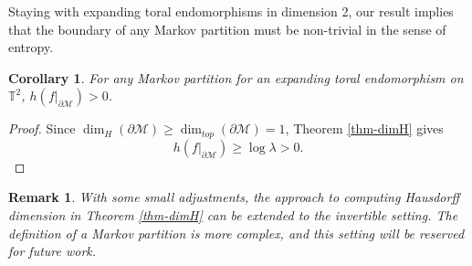 \documentclass{article}
\def\T{\mathbb{T}}
\def\M{\mathcal{M}}
\newtheorem{corollary}[theorem]{Corollary}
\newtheorem{remark}[theorem]{Remark}
\begin{document}
Staying with expanding toral endomorphisms in dimension 2, our result implies that the boundary of any Markov partition must be non-trivial in the sense of entropy.

\begin{corollary}
    For any Markov partition for an expanding toral endomorphism on $\T^2$, $h(f|_{\partial\M})>0$.
\end{corollary}

\begin{proof}
    Since $\dim_H(\partial\M)\geq \dim_{top}(\partial\M) = 1$, Theorem \ref{thm-dimH} gives $$h(f|_{\partial\M})\geq \log\lambda > 0.$$
\end{proof}


\begin{remark}
    With some small adjustments, the approach to computing Hausdorff dimension in Theorem \ref{thm-dimH} can be extended to the invertible setting. The definition of a Markov partition is more complex, and this setting will be reserved for future work.
\end{remark}








\newpage
\end{document}
